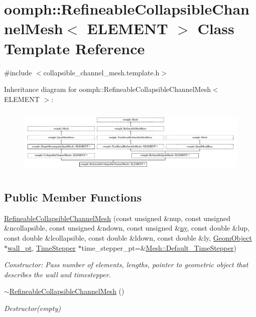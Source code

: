 \hypertarget{classoomph_1_1RefineableCollapsibleChannelMesh}{}\section{oomph\+:\+:Refineable\+Collapsible\+Channel\+Mesh$<$ E\+L\+E\+M\+E\+NT $>$ Class Template Reference}
\label{classoomph_1_1RefineableCollapsibleChannelMesh}


{\ttfamily \#include $<$collapsible\+\_\+channel\+\_\+mesh.\+template.\+h$>$}

Inheritance diagram for oomph\+:\+:Refineable\+Collapsible\+Channel\+Mesh$<$ E\+L\+E\+M\+E\+NT $>$\+:\begin{figure}[H]
\begin{center}
\leavevmode
\includegraphics[height=3.246377cm]{classoomph_1_1RefineableCollapsibleChannelMesh}
\end{center}
\end{figure}
\subsection*{Public Member Functions}
\begin{DoxyCompactItemize}
\item 
\hyperlink{classoomph_1_1RefineableCollapsibleChannelMesh_a0abc3741a7b74dd543096fb303b96243}{Refineable\+Collapsible\+Channel\+Mesh} (const unsigned \&nup, const unsigned \&ncollapsible, const unsigned \&ndown, const unsigned \&\hyperlink{classoomph_1_1SimpleRectangularQuadMesh_a45011f22dedd480392b1f376e4269921}{ny}, const double \&lup, const double \&lcollapsible, const double \&ldown, const double \&ly, \hyperlink{classoomph_1_1GeomObject}{Geom\+Object} $\ast$\hyperlink{classoomph_1_1CollapsibleChannelMesh_a04ffeb61678763dfd250962ea9ba614b}{wall\+\_\+pt}, \hyperlink{classoomph_1_1TimeStepper}{Time\+Stepper} $\ast$time\+\_\+stepper\+\_\+pt=\&\hyperlink{classoomph_1_1Mesh_a12243d0fee2b1fcee729ee5a4777ea10}{Mesh\+::\+Default\+\_\+\+Time\+Stepper})
\begin{DoxyCompactList}\small\item\em Constructor\+: Pass number of elements, lengths, pointer to geometric object that describes the wall and timestepper. \end{DoxyCompactList}\item 
\hyperlink{classoomph_1_1RefineableCollapsibleChannelMesh_ae429201cc0fe53f5abf96b7d9564df65}{$\sim$\+Refineable\+Collapsible\+Channel\+Mesh} ()
\begin{DoxyCompactList}\small\item\em Destructor(empty) \end{DoxyCompactList}\end{DoxyCompactItemize}
